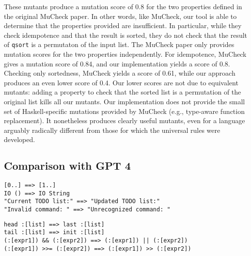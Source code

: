 \documentclass[acmsmall,screen,review,anonymous]{acmart}
\begin{document}
{These mutants produce a mutation
score of 0.8 for the two properties defined in the original MuCheck
paper.  In other words, like MuCheck, our tool is able to
determine that the properties provided are insufficient.  In
particular, while they check idempotence and that the result is
sorted, they do not check that the result of {\tt qsort} is a permutaton of the input
list.  The MuCheck paper only provides mutation scores for the two
properties independently.  For idempotence, MuCheck gives a mutation
score of 0.84, and our implementation yields a score of 0.8.  Checking
only sortedness, MuCheck yields a score of 0.61, while our approach
produces an even lower score of 0.4.  Our lower
scores are not due to equivalent mutants: adding a property to check
that the sorted list is a permutation of the original list kills all
our mutants.  Our implementation does not provide the small set of Haskell-specific
mutations provided by MuCheck (e.g., type-aware function replacement).  It nonetheless produces clearly useful
mutants, even for a language arguably radically different from those
for which the universal rules were developed. 

\subsection{Comparison with GPT 4}




\begin{lstlisting}[caption={\textbf{Example of GPT-4 Mutants for a Simple Haskell Program}},label=lst:haskellmutants]
[0..] ==> [1..]
IO () ==> IO String  
"Current TODO list:" ==> "Updated TODO list:"
"Invalid command: " ==> "Unrecognized command: "
\end{lstlisting}

\begin{lstlisting}[caption={\textbf{GPT-4 Comby Haskell Rules}},label=lst:haskellcomby]
head :[list] ==> last :[list]
tail :[list] ==> init :[list]
(:[expr1]) && (:[expr2]) ==> (:[expr1]) || (:[expr2])
(:[expr1]) >>= (:[expr2]) ==> (:[expr1]) >> (:[expr2])
\end{lstlisting}


}
\end{document}
